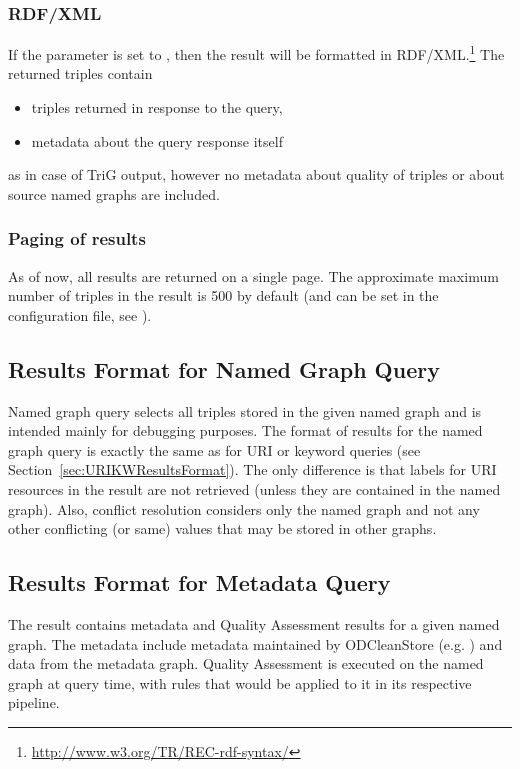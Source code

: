 \subsubsection{RDF/XML}
\label{sec:URIKWRDFXML}

If the  parameter is set to , then the result will be formatted in RDF/XML.\footnote{\url{http://www.w3.org/TR/REC-rdf-syntax/}} The returned triples contain

\begin{itemize}
  \item triples returned in response to the query,
  \item  metadata about the query response itself
\end{itemize}

as in case of TriG output, however no metadata about quality of triples or about source named graphs are included.

\subsubsection{Paging of results}
\label{sec:URIKWPaging}
As of now, all results are returned on a single page. The approximate maximum number of triples in the result is 500 by default (and can be set in the configuration file, see ).

\subsection{Results Format for Named Graph Query}
Named graph query selects all triples stored in the given named graph and is intended mainly for debugging purposes.
The format of results for the named graph query is exactly the same as for URI or keyword queries (see Section~\ref{sec:URIKWResultsFormat}). The only difference is that labels for URI resources in the result are not retrieved (unless they are contained in the named graph). Also, conflict resolution considers only the named graph and not any other conflicting (or same) values that may be stored in other graphs.

\subsection{Results Format for Metadata Query}
The result contains metadata and Quality Assessment results for a given named graph. The metadata include metadata maintained by ODCleanStore (e.g. ) and data from the  metadata graph. Quality Assessment is executed on the named graph at query time, with rules that would be applied to it in its respective pipeline.

